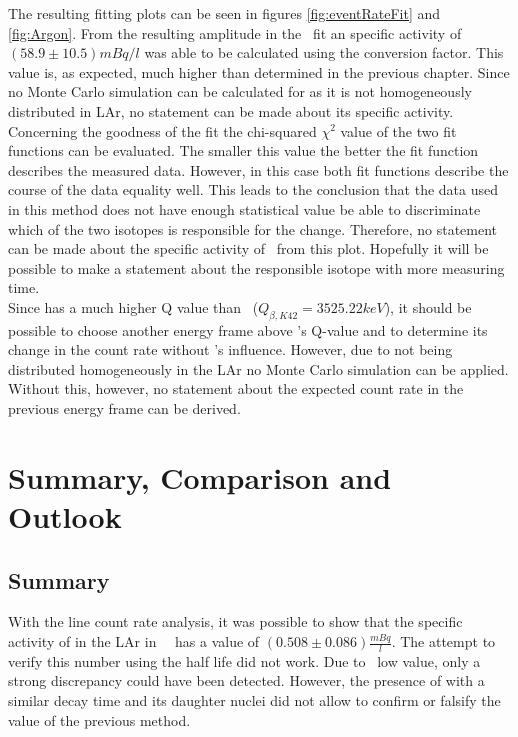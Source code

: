 \documentclass[encoding=utf8,british]{tumphthesis}
\begin{document}
The resulting fitting plots can be seen in figures \ref{fig:eventRateFit} and \ref{fig:Argon}.
From the resulting amplitude in the \Kr\ fit an specific activity of $(58.9\pm10.5) \unit{mBq}/\unit{l}$ was able to be calculated using the conversion factor.
This value is, as expected, much higher than determined in the previous chapter.
Since no Monte Carlo simulation can be calculated for  as it is not homogeneously distributed in LAr, no statement can be made about its specific activity.
\\

Concerning the goodness of the fit the chi-squared $\chi^2$ value of the two fit functions can be evaluated.
The smaller this value the better the fit function describes the measured data.
However, in this case both fit functions describe the course of the data equality well.
This leads to the conclusion that the data used in this method does not have enough statistical value be able to discriminate  which of the two isotopes is responsible for the change.
Therefore, no statement can be made about the specific activity of \Kr\ from this plot.
Hopefully it will be possible to make a statement about the responsible isotope with more measuring time.
\\

Since  has a much higher Q value than \Kr\ ($Q_{\beta,K42} = 3525.22 \unit{keV}$), it should be possible to choose another energy frame above \Kr's Q-value and to determine its change in the count rate without \Kr's influence.
However, due to  not being distributed homogeneously in the LAr no Monte Carlo simulation can be applied.
Without this, however, no statement about the expected count rate in the previous energy frame can be derived.










\chapter{Summary, Comparison and Outlook}
\label{sec:ConcAndOutlook}
\section{Summary}
With the line count rate analysis, it was possible to show that the specific activity of  in the LAr in \gerda\ \PII\ has a value of $(0.508\pm0.086) \frac{\unit{mBq}}{\unit{l}}$. 
The attempt to verify this number using the half life did not work.
Due to \Kr\ low value, only a strong discrepancy could have been detected.
However, the presence of  with a similar decay time and its daughter nuclei  did not allow to confirm or falsify the value of the previous method.
\end{document}
